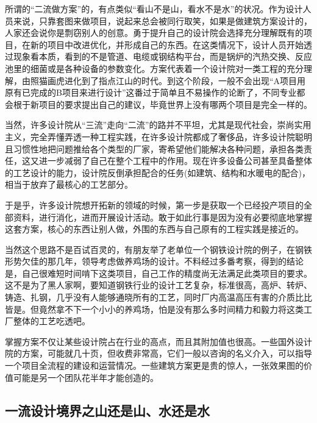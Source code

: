 \documentclass[]{book}
\begin{document}
所谓的``二流做方案''的，有点类似``看山不是山，看水不是水''的状况。作为设计人员来说，只靠套图来做项目，说起来总会被同行取笑，如果是做建筑方案设计的，人家还会说你是剽窃别人的创意。勇于提升自己的设计院会选择充分理解既有的项目，在新的项目中改进优化，并形成自己的东西。在这类情况下，设计人员开始透过现象看本质，看到的不是管道、电缆或钢结构平台，而是锅炉的汽热交换、反应池里的细菌或是各种设备的参数变化。方案代表着一个设计院对一类工程的充分理解，由照猫画虎进化到了指点江山的时代。到这个阶段，一般不会出现``A项目用原有已完成的B项目来进行设计''这番过于简单且不易操作的论断了，不同专业都会根于新项目的要求提出自己的建议，毕竟世界上没有哪两个项目是完全一样的。

当然，许多设计院从``三流''走向``二流''的路并不平坦，尤其是现代社会，崇尚实用主义，完全弄懂弄透一种工程实践，在许多设计院都成了奢侈品，许多设计院聪明且习惯性地把问题推给各个类型的厂家，寄希望他们能解决各种问题，承担各类责任，这又进一步减弱了自己在整个工程中的作用。现在许多设备公司甚至具备整体的工艺设计的能力，设计院反倒承担配合的任务(如建筑、结构和水暖电的配合)，相当于放弃了最核心的工艺部分。

于是乎，许多设计院想开拓新的领域的时候，第一步是获取一个已经投产项目的全部资料，进行消化，进而开展设计活动。敢于如此行事是因为没有必要彻底地掌握这套方案，核心的东西让别人做，外围的东西与自己原有的工程实践是接近的。

当然这个思路不是百试百灵的，有朋友举了老单位一个钢铁设计院的例子，在钢铁形势欠佳的那几年，领导考虑做养鸡场的设计。不料经过多番考察，得到的结论是，自己很难短时间啃下这类项目，自己工作的精度尚无法满足此类项目的要求。这不是为了黑人家啊，要知道钢铁行业的设计工艺复杂，标准很高，高炉、转炉、铸造、扎钢，几乎没有人能够通晓所有的工艺，同时厂内高温高压有害的介质比比皆是。但竟然拿不下一个小小的养鸡场，怕是没有那么多时间精力和毅力将这类工厂整体的工艺吃透吧。

掌握方案不仅让某些设计院占在行业的高点，而且其附加值也很高。一些国外设计院的方案，可能就几十页，但收费非常高，它们一般以咨询的名义介入，可以指导一个项目全流程的建设和运营情况。一些建筑方案更是贵的惊人，一张效果图的价值可能是另一个团队花半年才能创造的。

\hypertarget{ux4e00ux6d41ux8bbeux8ba1ux5883ux754cux4e4bux5c71ux8fd8ux662fux5c71ux6c34ux8fd8ux662fux6c34}{%
\subsection{一流设计境界之山还是山、水还是水}\label{ux4e00ux6d41ux8bbeux8ba1ux5883ux754cux4e4bux5c71ux8fd8ux662fux5c71ux6c34ux8fd8ux662fux6c34}}
\end{document}
